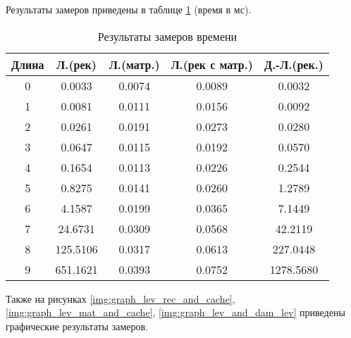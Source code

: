 Результаты замеров приведены в таблице \ref{tbl:time_mes} (время в мс).

\begin{table}[h]
    \begin{center}
        \begin{threeparttable}
        \captionsetup{justification=raggedright,singlelinecheck=off}
        \caption{Результаты замеров времени}
        \label{tbl:time_mes}
        \begin{tabular}{|c|c|c|c|c|}
            \hline
            Длина & Л.(рек) & Л.(матр.)& Л.(рек с матр.) & Д.-Л.(рек.)  \\
            \hline
            0 & 0.0033 & 0.0074 & 0.0089 & 0.0032 \\ 
            \hline
            1 & 0.0081 & 0.0111 & 0.0156 & 0.0092 \\ 
            \hline
            2 & 0.0261 & 0.0191 & 0.0273 & 0.0280 \\ 
            \hline
            3 & 0.0647 & 0.0115 & 0.0192 & 0.0570 \\ 
            \hline
            4 & 0.1654 & 0.0113 & 0.0226 & 0.2544 \\ 
            \hline
            5 & 0.8275 & 0.0141 & 0.0260 & 1.2789 \\ 
            \hline
            6 & 4.1587 & 0.0199 & 0.0365 & 7.1449 \\ 
            \hline
            7 & 24.6731 & 0.0309 & 0.0568 & 42.2119 \\ 
            \hline
            8 & 125.5106 & 0.0317 & 0.0613 & 227.0448 \\ 
            \hline
            9 & 651.1621 & 0.0393 & 0.0752 & 1278.5680 \\ 
            \hline
		\end{tabular}
    \end{threeparttable}
\end{center}
\end{table}

Также на рисунках \ref{img:graph_lev_rec_and_cache}, \ref{img:graph_lev_mat_and_cache}, \ref{img:graph_lev_and_dam_lev} приведены графические результаты замеров.

\clearpage


